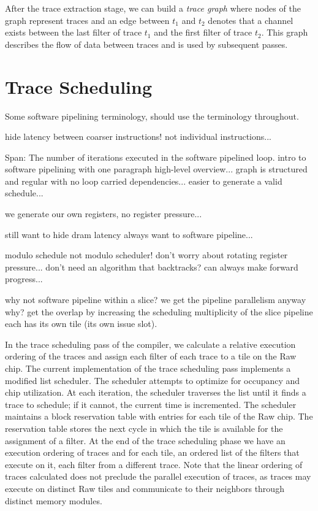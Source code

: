 After the trace extraction stage, we can build a {\it trace graph}
where nodes of the graph represent traces and an edge between $t_1$
and $t_2$ denotes that a channel exists between the last filter of
trace $t_1$ and the first filter of trace $t_2$. This graph describes
the flow of data between traces and is used by subsequent passes.

\section{Trace Scheduling}
Some software pipelining terminology, should use the terminology
throughout. 

hide latency between coarser instructions! not individual
instructions...



Span:  The number of iterations executed in the software pipelined
loop.
intro to software pipelining with one paragraph high-level overview...
graph is structured and regular with no loop carried dependencies...
easier to generate a valid schedule...

we generate our own registers, no register pressure...

still want to hide dram latency always want to software pipeline...

modulo schedule not modulo scheduler!
don't worry about rotating register pressure...
don't need an algorithm that backtracks? can always make forward
progress...

why not software pipeline within a slice?  
	we get the pipeline parallelism anyway
	why?
	get the overlap by increasing the scheduling multiplicity 
	of the slice pipeline 
	each has its own tile (its own issue slot).
	

\label{sec:scheduling}
In the trace scheduling pass of the compiler, we calculate a relative
execution ordering of the traces and assign each filter of each trace
to a tile on the Raw chip.  The current implementation of the trace
scheduling pass implements a modified list scheduler. The scheduler
attempts to optimize for occupancy and chip utilization.  At each
iteration, the scheduler traverses the list until it finds a trace to
schedule; if it cannot, the current time is incremented.  The
scheduler maintains a block reservation table with entries for each
tile of the Raw chip.  The reservation table stores the next cycle in
which the tile is available for the assignment of a filter.  At the
end of the trace scheduling phase we have an execution ordering of
traces and for each tile, an ordered list of the filters that execute
on it, each filter from a different trace. Note that the linear
ordering of traces calculated does not preclude the parallel execution
of traces, as traces may execute on distinct Raw tiles and communicate
to their neighbors through distinct memory modules.

